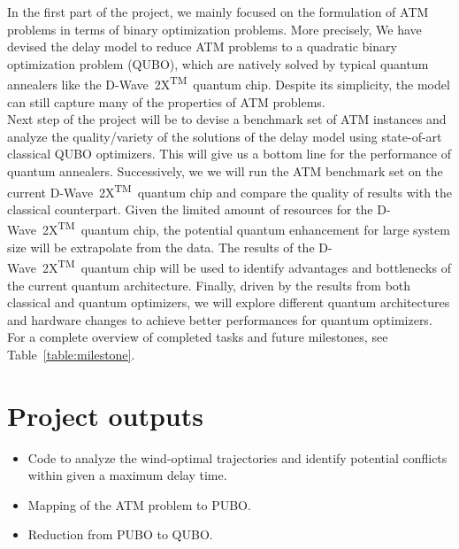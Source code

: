 \documentclass[9pt]{extarticle}
\renewcommand{\tablename}{Table}
\newcommand{\DW}{\mbox{D-Wave 2X\textsuperscript{TM}}~}
\begin{document}
In the first part of the project, we mainly focused on the formulation of ATM problems in terms of binary optimization problems. More precisely,
We have devised the delay model to reduce ATM problems to a quadratic binary optimization problem (QUBO), which are natively solved by typical 
quantum annealers like the \DW quantum chip. Despite its simplicity, the model can still capture many of the properties of ATM problems. \\

Next step of the project will be to devise a benchmark set of ATM instances and analyze the quality/variety of the solutions of the delay model using 
state-of-art classical QUBO optimizers. This will give us a bottom line for the performance of quantum annealers. Successively, we 
we will run the ATM benchmark set on the current \DW quantum chip and compare the quality of results with the classical counterpart. Given the limited
amount of resources for the \DW quantum chip, the potential quantum enhancement for large system size will
be extrapolate from the data. The results of the \DW quantum chip will be used to identify advantages and bottlenecks of
the current quantum architecture. Finally, driven by the results from both classical and quantum optimizers, 
we will explore different quantum architectures and hardware changes to achieve better performances for quantum optimizers.\\

For a complete overview of completed tasks and future milestones, see \tablename~\ref{table:milestone}.

\section*{Project outputs}

\begin{itemize}
	\item Code to analyze the wind-optimal trajectories and identify potential conflicts within given a maximum delay time.
	\item Mapping of the ATM problem to PUBO.
	\item Reduction from PUBO to QUBO.
\end{itemize}
\end{document}
